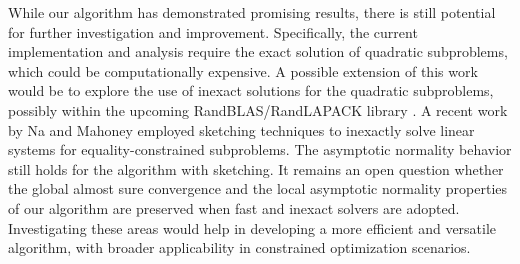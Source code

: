 \documentclass[aos]{imsart}
\numberwithin{equation}{section}
\theoremstyle{plain}
\begin{document}
While our algorithm has demonstrated promising results, there is still potential for further investigation and improvement. 
Specifically, the current implementation and analysis require the exact solution of quadratic subproblems, which could be computationally expensive. 
A possible extension of this work would be to explore the use of inexact solutions for the quadratic subproblems, possibly within the upcoming RandBLAS/RandLAPACK library \cite{randlapack_book_v2_arxiv}. 
A recent work by Na and Mahoney \cite{na2022asymptotic} employed sketching techniques to inexactly solve linear systems for equality-constrained subproblems. 
The asymptotic normality behavior still holds for the algorithm with sketching. 
It remains an open question whether the global almost sure convergence and the local asymptotic normality properties of our algorithm are preserved when fast and inexact solvers are adopted. 
Investigating these areas would help in developing a more efficient and versatile algorithm, with broader applicability in constrained optimization scenarios.




 

\end{document}

